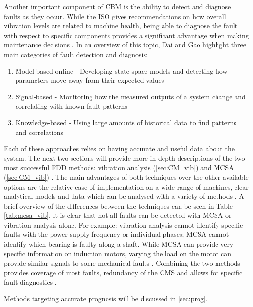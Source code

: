 Another important component of CBM is the ability to detect and diagnose faults as they occur.
While the ISO gives recommendations on how overall vibration levels are related to machine health, being able to diagnose the fault with respect to specific components provides a significant advantage when making maintenance decisions \cite{ISO10816-7}\cite{CM_mcsa_vib}.
In an overview of this topic, Dai and Gao \cite{CM_dai_gao_2013} highlight three main categories of fault detection and diagnosis:

\begin{enumerate}
    \item Model-based online - Developing state space models and detecting how parameters move away from their expected values
    \item Signal-based - Monitoring how the measured outputs of a system change and correlating with known fault patterns
    \item Knowledge-based - Using large amounts of historical data to find patterns and correlations
\end{enumerate}

Each of these approaches relies on having accurate and useful data about the system.
The next two sections will provide more in-depth descriptions of the two most successful FDD methods: vibration analysis (\ref{sec:CM_vib}) and MCSA (\ref{sec:CM_vib}) \cite{CM_mcsa_vib}.
The main advantages of both techniques over the other available options are the  relative ease of implementation on a wide range of machines, clear analytical models and data which can be analysed with a variety of methods \cite{CM_dai_gao_2013}\cite{CM_mcsa_vib}.
A brief overview of the differences between the techniques can be seen in Table \ref{tab:mcsa_vib}.
It is clear that not all faults can be detected with MCSA or vibration analysis alone.
For example: vibration analysis cannot identify specific faults with the power supply frequency or individual phases; MCSA cannot identify which bearing is faulty along a shaft.
While MCSA can provide very specific information on induction motors, varying the load on the motor can provide similar signals to some mechanical faults \cite{CM_mcsa_vib}.
Combining the two methods provides coverage of most faults, redundancy of the CMS and allows for specific fault diagnostics \cite{CM_mcsa_vib}\cite{VIB_wireless_sensor}\cite{VIB_MCSA_comb}.
\par

Methods targeting accurate prognosis will be discussed in \ref{sec:prog}.

